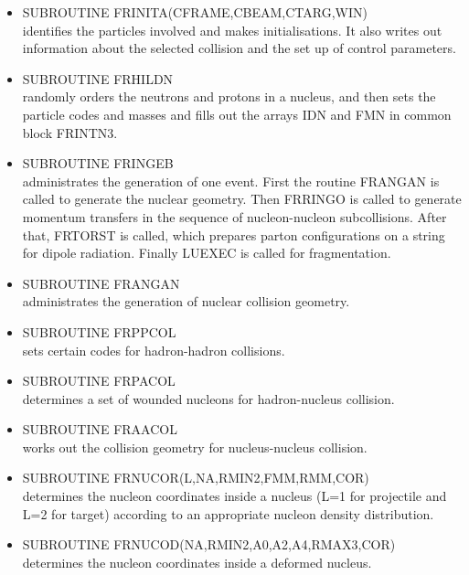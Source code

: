 \begin{itemize} 
\item  SUBROUTINE FRINITA(CFRAME,CBEAM,CTARG,WIN) \\
  identifies the particles involved and makes initialisations.  It also
  writes out information about the selected collision and the set up
  of control parameters.  

\item  SUBROUTINE FRHILDN \\
  randomly orders the neutrons and protons in a nucleus, and then sets the
  particle codes and masses and fills out the arrays
  IDN and FMN in common block FRINTN3.

\item  SUBROUTINE FRINGEB \\
  administrates the generation of one event. 
  First the routine FRANGAN is called to generate the nuclear 
  geometry. Then FRRINGO is called to generate momentum transfers 
  in the sequence of nucleon-nucleon subcollisions.  After that,   
  FRTORST is called, which prepares parton configurations on a string 
  for dipole radiation.  Finally LUEXEC is called for fragmentation.

\item  SUBROUTINE FRANGAN \\
  administrates the generation of nuclear collision geometry.

\item  SUBROUTINE FRPPCOL \\
 sets certain codes for hadron-hadron collisions.

\item  SUBROUTINE FRPACOL \\
 determines a set of wounded nucleons for hadron-nucleus collision.

\item  SUBROUTINE FRAACOL \\
 works out the collision geometry for nucleus-nucleus collision.

\item  SUBROUTINE FRNUCOR(L,NA,RMIN2,FMM,RMM,COR) \\
 determines the nucleon coordinates inside a nucleus (L=1 for projectile
 and L=2 for target) according to an appropriate nucleon density distribution.

\item  SUBROUTINE FRNUCOD(NA,RMIN2,A0,A2,A4,RMAX3,COR) \\
 determines the nucleon coordinates inside a deformed nucleus.


\end{itemize}
